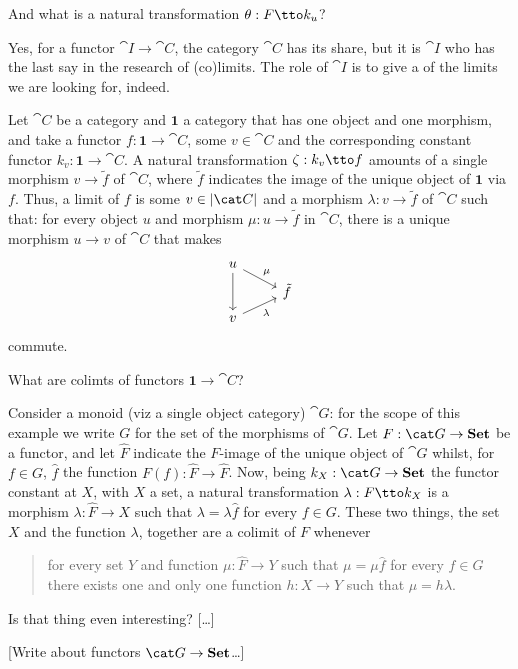 \begin{exercise}
And what is a natural transformation \(\theta : F \tto k_u\)?
\end{exercise}

Yes, for a functor \(\cat I \to \cat C\), the category \(\cat C\) has its share, but it is \(\cat I\) who has the last say in the research of (co)limits. The role of \(\cat I\) is to give a  of the limits we are looking for, indeed.

\begin{example}
Let \(\cat C\) be a category and \(\mathbf 1\) a category that has one object and one morphism, and take a functor \(f : \mathbf 1 \to \cat C\), some \(v \in \cat C\) and the corresponding constant functor \(k_v : \mathbf 1 \to \cat C\). A natural transformation \(\zeta : k_v \tto f\) amounts of a single morphism \(v \to \tilde f\) of \(\cat C\), where \(\tilde f\) indicates the image of the unique object of \(\mathbf 1\) via \(f\). Thus, a limit of \(f\) is some \(v \in \obj{\cat C}\) and a morphism \(\lambda : v \to \tilde f\) of \(\cat C\) such that: for every object \(u\) and morphism \(\mu : u \to \tilde f\) in \(\cat C\), there is a unique morphism \(u \to v\) of \(\cat C\) that makes
\[\begin{tikzcd}[row sep=tiny]
u \ar["\mu", dr] \ar[dd] \\
& \tilde f \\
v \ar["\lambda", ur, swap]
\end{tikzcd}\]
commute.
\end{example}

\begin{exercise}
What are colimts of functors \(\mathbf 1 \to \cat C\)?
\end{exercise}

\begin{sandbox}
Consider a monoid (viz a single object category) \(\cat G\): for the scope of this example we write \(G\) for the set of the morphisms of \(\cat G\). Let \(F : \cat G \to \Set\) be a functor, and let \(\hat F\) indicate the \(F\)-image of the unique object of \(\cat G\) whilst, for \(f \in G\), \(\hat f\) the function \(F(f) : \hat F \to \hat F\). Now, being \(k_X : \cat G \to \Set\) the functor constant at \(X\), with \(X\) a set, a natural transformation \(\lambda : F \tto k_X\) is a morphism \(\lambda : \hat F \to X\) such that \(\lambda = \lambda \hat f\) for every \(f \in G\). These two things, the set \(X\) and the function \(\lambda\), together are a colimit of \(F\) whenever
\begin{quotation}
for every set \(Y\) and function \(\mu : \hat F \to Y\) such that \(\mu = \mu \hat f\) for every \(f \in G\) there exists one and only one function \(h : X \to Y\) such that \(\mu = h \lambda\).
\end{quotation}
Is that thing even interesting? [\dots{}]

[Write about functors \(\cat G \to \Set\)\dots{}]
\end{sandbox}
